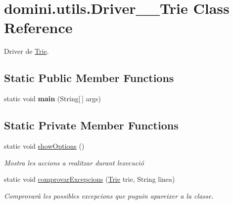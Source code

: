 \hypertarget{classdomini_1_1utils_1_1Driver____Trie}{}\section{domini.\+utils.\+Driver\+\_\+\+\_\+\+Trie Class Reference}
\label{classdomini_1_1utils_1_1Driver____Trie}


Driver de \hyperlink{classdomini_1_1utils_1_1Trie}{Trie}.  


\subsection*{Static Public Member Functions}
\begin{DoxyCompactItemize}
\item 
\mbox{\label{classdomini_1_1utils_1_1Driver____Trie_a00769a23a8d74a6f4bc05c19a2bd8519}} 
static void {\bfseries main} (String\mbox{[}$\,$\mbox{]} args)
\end{DoxyCompactItemize}
\subsection*{Static Private Member Functions}
\begin{DoxyCompactItemize}
\item 
\mbox{\label{classdomini_1_1utils_1_1Driver____Trie_a8b61698744500c2c6ffa92f861162ff5}} 
static void \hyperlink{classdomini_1_1utils_1_1Driver____Trie_a8b61698744500c2c6ffa92f861162ff5}{show\+Options} ()
\begin{DoxyCompactList}\small\item\em Mostra les accions a realitzar durant l\textquotesingle{}execució \end{DoxyCompactList}\item 
static void \hyperlink{classdomini_1_1utils_1_1Driver____Trie_a4b7da837f4ab40b07d4b06730c8e015a}{comprovar\+Excepcions} (\hyperlink{classdomini_1_1utils_1_1Trie}{Trie} trie, String linea)
\begin{DoxyCompactList}\small\item\em Comprovarà les possibles excepcions que puguin apareixer a la classe. \end{DoxyCompactList}\end{DoxyCompactItemize}


